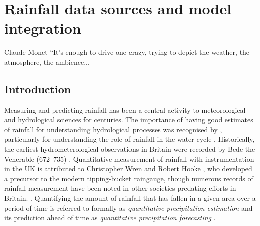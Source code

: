 \chapter{Rainfall data sources and model integration}
\label{chapter_metdata}

% 
%
\begin{chapquote}{Claude Monet \textit{}}
``It's enough to drive one crazy, trying to depict the weather, the atmosphere, the ambience...
\end{chapquote}

\section{Introduction}

Measuring and predicting rainfall has been a central activity to meteorological and hydrological sciences for centuries. The importance of having good estimates of rainfall for understanding hydrological processes was recognised by \citet{perrault1674}, particularly for understanding the role of rainfall in the water cycle \citep{biswas1970history}. Historically, the earliest hydrometerological observations in Britain were recorded by Bede the Venerable (672--735) \citep{mcculloch1993history}. Quantitative measurement of rainfall with instrumentation in the UK is attributed to Christopher Wren and Robert Hooke \citep{biswas1970history}, who developed a precursor to the modern tipping-bucket raingauge, though numerous records of rainfall measurement have been noted in other societies predating efforts in Britain. \citep{strangeways2010history}. Quantifying the amount of rainfall that has fallen in a given area over a period of time is referred to formally as \textit{quantitative precipitation estimation} \citep{fabry2015radar} and its prediction ahead of time as \textit{quantitative precipitation forecasting} \citep{golding2000quantitative,browning2003quantitative}.


